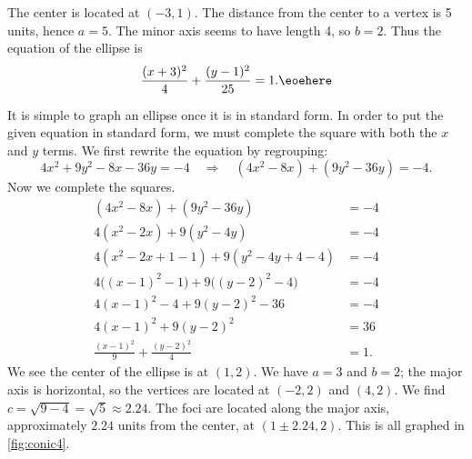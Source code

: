 {The center is located at $(-3,1)$. The distance from the center to a vertex is 5 units, hence $a=5$. The minor axis seems to have length 4, so $b=2$. Thus the equation of the ellipse is $$\frac{(x+3)^2}{4}+\frac{(y-1)^2}{25} = 1.\eoehere$$}

{It is simple to graph an ellipse once it is in standard form. In order to put the given equation in standard form, we must complete the square with both the $x$ and $y$ terms. We first rewrite the equation by regrouping:
$$4x^2+9y^2-8x-36y=-4 \quad \Rightarrow \quad (4x^2-8x) + (9y^2-36y) = -4.$$
Now we complete the squares.
\begin{align*}
	(4x^2-8x) + (9y^2-36y) &= -4\\
	4(x^2-2x) + 9(y^2-4y) &= -4 \\
	4(x^2-2x +1 - 1) + 9(y^2-4y+4-4) &= - 4\\
	4\big((x-1)^2-1\big) + 9\big((y-2)^2-4\big) &= -4\\
	4(x-1)^2 -4 + 9(y-2)^2-36 &= -4 \\
	4(x-1)^2 + 9(y-2)^2 &= 36 \\
	\frac{(x-1)^2}{9} + \frac{(y-2)^2}{4} &= 1.
\end{align*}
We see the center of the ellipse is at $(1,2)$. We have $a=3$ and $b=2$; the major axis is horizontal, so the vertices are located at $(-2,2)$ and $(4,2)$. We find $c=\sqrt{9-4} = \sqrt{5}\approx 2.24.$ The foci are located along the major axis, approximately $2.24$ units from the center, at $(1\pm 2.24,2)$. This is all graphed in \autoref{fig:conic4}.}

